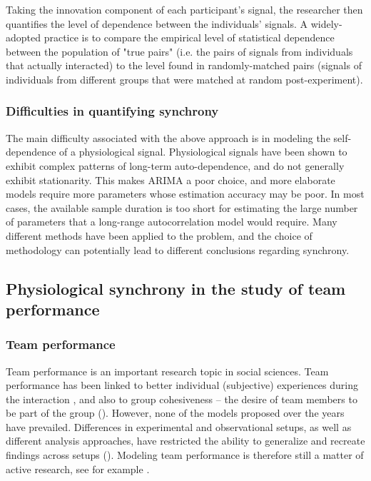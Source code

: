 \documentclass[a4paper, 11pt]{article}      %
\begin{document}
Taking the innovation component of each participant's signal, the researcher then quantifies the level of dependence between the individuals' signals. A widely-adopted practice is to compare the empirical level of statistical dependence between the population of "true pairs" (i.e. the pairs of signals from individuals that actually interacted) to the level found in randomly-matched pairs (signals of individuals from different groups that were matched at random post-experiment).

\subsubsection{Difficulties in quantifying synchrony}
The main difficulty associated with the above approach is in modeling the self-dependence of a physiological signal. Physiological signals have been shown to exhibit complex patterns of long-term auto-dependence, and do not generally exhibit stationarity. This makes ARIMA a poor choice, and more elaborate models require more parameters whose estimation accuracy may be poor. In most cases, the available sample duration is too short for estimating the large number of parameters that a long-range autocorrelation model would require. Many different methods have been applied to the problem, and the choice of methodology can potentially lead to different conclusions regarding synchrony.

\subsection{Physiological synchrony in the study of team performance}
\subsubsection{Team performance}
Team performance is an important research topic in social sciences. Team performance has been linked to better individual (subjective) experiences during the interaction \cite{lodahl1961psychometric}, and also to group cohesiveness -- the desire of team members to be part of the group (\cite{cartwright1968nature}). However, none of the models proposed over the years have prevailed. Differences in experimental and observational setups, as well as different analysis approaches, have restricted the ability to generalize and recreate findings across setups (\cite{beal2003cohesion}). Modeling team performance is therefore still a matter of active research, see for example \cite{collins2019explorations}.
\end{document}
